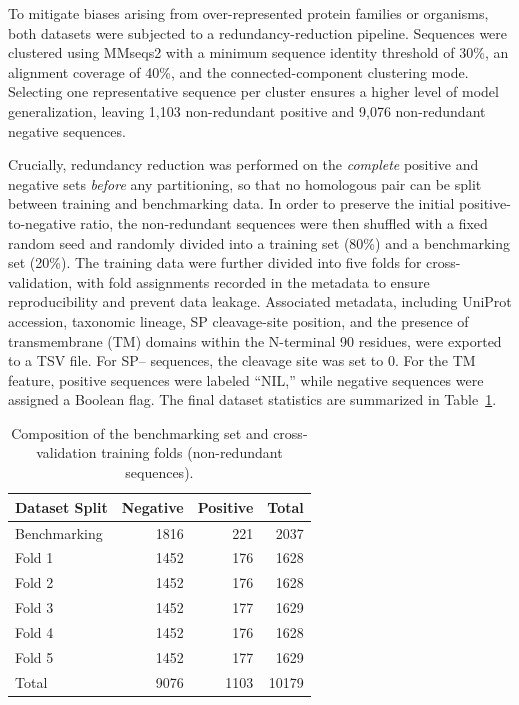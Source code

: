 \documentclass[unnumsec,webpdf,contemporary,large]{oup-authoring-template}
\begin{document}
To mitigate biases arising from over-represented protein families or organisms, both datasets were subjected to a redundancy-reduction pipeline. Sequences were clustered using MMseqs2 \cite{ref19} with a minimum sequence identity threshold of 30\%, an alignment coverage of 40\%, and the connected-component clustering mode. Selecting one representative sequence per cluster ensures a higher level of model generalization, leaving 1{,}103 non-redundant positive and 9{,}076 non-redundant negative sequences.

Crucially, redundancy reduction was performed on the \emph{complete} positive and negative sets \emph{before} any partitioning, so that no homologous pair can be split between training and benchmarking data. In order to preserve the initial positive-to-negative ratio, the non-redundant sequences were then shuffled with a fixed random seed and randomly divided into a training set (80\%) and a benchmarking set (20\%). The training data were further divided into five folds for cross-validation, with fold assignments recorded in the metadata to ensure reproducibility and prevent data leakage. Associated metadata, including UniProt accession, taxonomic lineage, SP cleavage-site position, and the presence of transmembrane (TM) domains within the N-terminal 90 residues, were exported to a TSV file. For SP-- sequences, the cleavage site was set to 0. For the TM feature, positive sequences were labeled ``NIL,'' while negative sequences were assigned a Boolean flag. The final dataset statistics are summarized in Table~\ref{tab:composition}.

\begin{table}[t]
\caption{Composition of the benchmarking set and cross-validation training folds (non-redundant sequences).}
\label{tab:composition}
\centering
\begin{tabular}{lrrr}
\toprule
Dataset Split & Negative & Positive & Total \\
\midrule
Benchmarking & 1816 & 221 & 2037 \\
Fold 1 & 1452 & 176 & 1628 \\
Fold 2 & 1452 & 176 & 1628 \\
Fold 3 & 1452 & 177 & 1629 \\
Fold 4 & 1452 & 176 & 1628 \\
Fold 5 & 1452 & 177 & 1629 \\
\midrule
Total & 9076 & 1103 & 10179 \\
\bottomrule
\end{tabular}
\end{table}
\end{document}
